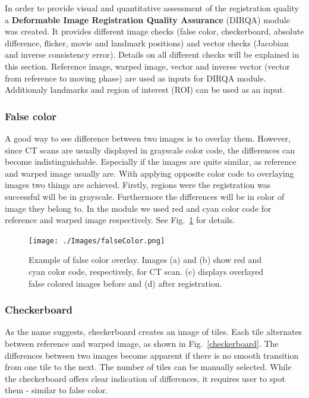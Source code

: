 \documentclass[type=dr, dr=rernat, accentcolor=tud7b,colorbacktitle, bigchapter, openright, twoside, 12pt ]{tudthesis}
\begin{document}
In order to provide visual and quantitative assessment of the registration quality a \textbf{Deformable Image Registration Quality Assurance} (DIRQA) module was created. It provides different image checks (false color, checkerboard, absolute difference, flicker, movie and landmark positions) and vector checks (Jacobian and inverse consistency error). Details on all different checks will be explained in this section. Reference image, warped image, vector and inverse vector (vector from reference to moving phase) are used as inputs for DIRQA module. Additionaly landmarks and region of interest (ROI) can be used as an input.

\subsubsection{False color}
\label{Sec:FalseColor}

A good way to see difference between two images is to overlay them. However, since CT scans are usually displayed in grayscale color code, the differences can become indistinguishable. Especially if the images are quite similar, as reference and warped image usually are. With applying opposite color code to overlaying images two things are achieved. Firstly, regions were the registration was successful will be in grayscale. Furthermore the differences will be in color of image they belong to. In the module we used red and cyan color code for reference and warped image respectively. See Fig.~\ref{falseColor} for details.

\begin{figure}[H]
	\begin{center}		
		\texttt{[image: ./Images/falseColor.png]}
		\caption{Example of false color overlay. Images (a) and (b) show red and cyan color code, respectively, for CT scan. (c) displays overlayed false colored images before and (d) after registration.}
		\label{falseColor}
	\end{center}
\end{figure}

\subsubsection{Checkerboard}

As the name suggests, checkerboard creates an image of tiles. Each tile alternates between reference and warped image, as shown in Fig.~\ref{checkerboard}. The differences between two images become apparent if there is no smooth transition from one tile to the next. The number of tiles can be manually selected. While the checkerboard offers clear indication of differences, it requires user to spot them - similar to false color.
\end{document}
